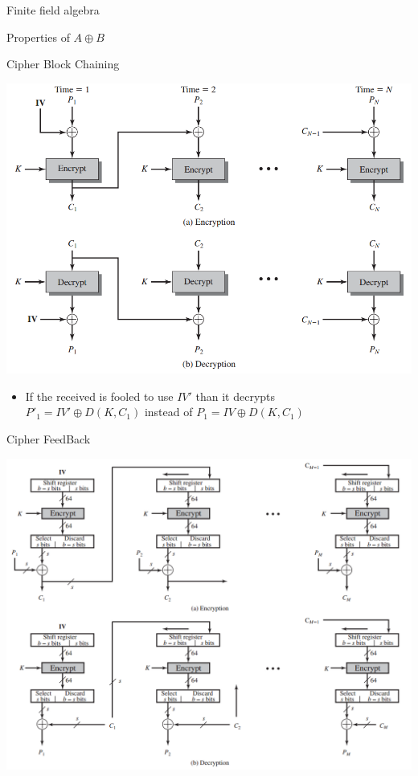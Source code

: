 \documentclass{beamer}
\begin{document}
\begin{frame}[t]{Finite field algebra}
  \begin{center}
    Properties of $A \oplus B$
  \end{center}
\end{frame}

\begin{frame}[t]{Cipher Block Chaining}
  \begin{center}
    \includegraphics[width=0.7\linewidth]{CBC}
  \end{center}
  \begin{itemize}
  \item<2-> If the received is fooled to use $IV'$ than it decrypts\\
    $P'_1 = IV' \oplus D(K,C_1)$ instead of 
    $P_1 = IV \oplus D(K,C_1)$
  \end{itemize}
\end{frame}

\begin{frame}[t]{Cipher FeedBack}
  \begin{center}
    \includegraphics[width=0.7\linewidth]{CFB}
  \end{center}
\end{frame}
\end{document}
